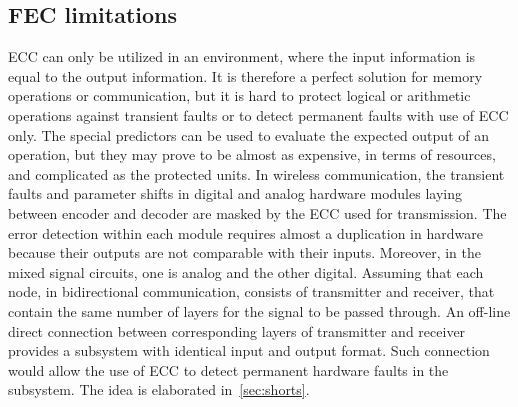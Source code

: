 \subsection{FEC limitations}\label{sub:limits}
ECC can only be utilized in an environment, where the input information is equal to the output information. It is therefore a perfect solution for memory operations or communication, but it is hard to protect logical or arithmetic operations against transient faults or to detect permanent faults with use of ECC only. The special predictors can be used to evaluate the expected output of an operation, but they may prove to be almost as expensive, in terms of resources, and complicated as the protected units. In wireless communication, the transient faults and parameter shifts in digital and analog hardware modules laying between encoder and decoder are masked by the ECC used for transmission. The error detection within each module requires almost a duplication in hardware because their outputs are not comparable with their inputs. Moreover, in the mixed signal circuits, one is analog and the other digital. Assuming that each node, in bidirectional communication, consists of transmitter and receiver, that contain the same number of layers for the signal to be passed through. An off-line direct connection between corresponding layers of transmitter and receiver provides a subsystem with identical input and output format. Such connection would allow the use of ECC to detect permanent hardware faults in the subsystem. The idea is elaborated in~\autoref{sec:shorts}.

